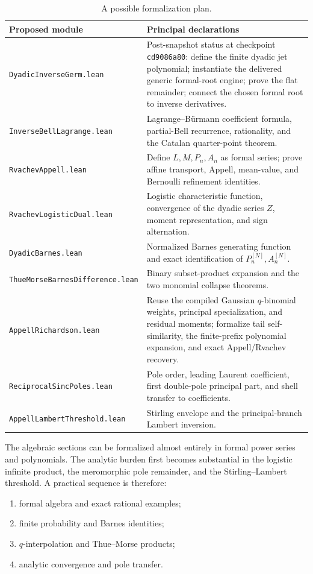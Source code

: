 \documentclass[11pt,oneside]{article}
\numberwithin{equation}{section}
\theoremstyle{definition}
\theoremstyle{remark}
\begin{document}
\begin{table}[htbp]
\centering
\small
\begin{tabularx}{\textwidth}{@{}>{\raggedright\arraybackslash}p{}X@{}}
\toprule
Proposed module & Principal declarations \\
\midrule
\texttt{DyadicInverseGerm.lean}
& Post-snapshot status at checkpoint \texttt{cd9086a80}: define the finite dyadic jet polynomial; instantiate the delivered generic formal-root engine; prove the flat remainder; connect the chosen formal root to inverse derivatives. \\
\texttt{InverseBellLagrange.lean}
& Lagrange--B\"urmann coefficient formula, partial-Bell recurrence, rationality, and the Catalan quarter-point theorem. \\
\texttt{RvachevAppell.lean}
& Define $L,M,P_n,A_n$ as formal series; prove affine transport, Appell, mean-value, and Bernoulli refinement identities. \\
\texttt{RvachevLogisticDual.lean}
& Logistic characteristic function, convergence of the dyadic series $Z$, moment representation, and sign alternation. \\
\texttt{DyadicBarnes.lean}
& Normalized Barnes generating function and exact identification of $P_n^{[N]},A_n^{[N]}$. \\
\texttt{ThueMorseBarnesDifference.lean}
& Binary subset-product expansion and the two monomial collapse theorems. \\
\texttt{AppellRichardson.lean}
& Reuse the compiled Gaussian $q$-binomial weights, principal specialization, and residual moments; formalize tail self-similarity, the finite-prefix polynomial expansion, and exact Appell/Rvachev recovery. \\
\texttt{ReciprocalSincPoles.lean}
& Pole order, leading Laurent coefficient, first double-pole principal part, and shell transfer to coefficients. \\
\texttt{AppellLambertThreshold.lean}
& Stirling envelope and the principal-branch Lambert inversion. \\
\bottomrule
\end{tabularx}
\caption{A possible formalization plan.}
\label{p2:tab:lean-roadmap}
\end{table}

The algebraic sections can be formalized almost entirely in formal power series and polynomials.
The analytic burden first becomes substantial in the logistic infinite product, the meromorphic pole
remainder, and the Stirling--Lambert threshold.  A practical sequence is therefore:
\begin{enumerate}
\item formal algebra and exact rational examples;
\item finite probability and Barnes identities;
\item $q$-interpolation and Thue--Morse products;
\item analytic convergence and pole transfer.
\end{enumerate}
\end{document}
